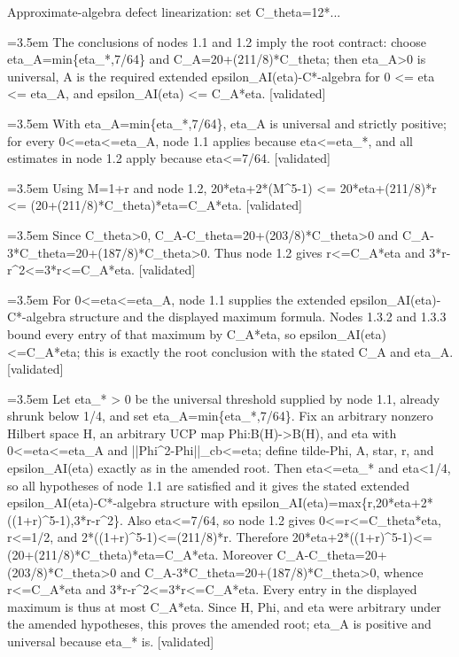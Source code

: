 \documentclass{article}
\newcommand{\step}[1]{\par\noindent\hangindent=3.5em\hangafter=1%
  \makebox[3.5em][l]{\textbf{#1.}}}
\newcommand{\steptag}[1]{\hfill{\small\textsf{[#1]}}}
\begin{document}
\begin{proofbox}{Approximate-algebra defect linearization: set C\_theta=12*...}
\step{1.3} The conclusions of nodes 1.1 and 1.2 imply the root contract: choose eta\_A=min\{eta\_*,7/64\} and C\_A=20+(211/8)*C\_theta; then eta\_A>0 is universal, A is the required extended epsilon\_AI(eta)-C*-algebra for 0 <= eta <= eta\_A, and epsilon\_AI(eta) <= C\_A*eta. \steptag{validated} \\[6pt]
\step{1.3.1} With eta\_A=min\{eta\_*,7/64\}, eta\_A is universal and strictly positive; for every 0<=eta<=eta\_A, node 1.1 applies because eta<=eta\_*, and all estimates in node 1.2 apply because eta<=7/64. \steptag{validated} \\[4pt]
\step{1.3.2} Using M=1+r and node 1.2, 20*eta+2*(M\textasciicircum{}5-1) <= 20*eta+(211/8)*r <= (20+(211/8)*C\_theta)*eta=C\_A*eta. \steptag{validated} \\[4pt]
\step{1.3.3} Since C\_theta>0, C\_A-C\_theta=20+(203/8)*C\_theta>0 and C\_A-3*C\_theta=20+(187/8)*C\_theta>0. Thus node 1.2 gives r<=C\_A*eta and 3*r-r\textasciicircum{}2<=3*r<=C\_A*eta. \steptag{validated} \\[4pt]
\step{1.3.4} For 0<=eta<=eta\_A, node 1.1 supplies the extended epsilon\_AI(eta)-C*-algebra structure and the displayed maximum formula. Nodes 1.3.2 and 1.3.3 bound every entry of that maximum by C\_A*eta, so epsilon\_AI(eta)<=C\_A*eta; this is exactly the root conclusion with the stated C\_A and eta\_A. \steptag{validated} \\[4pt]
\step{1.4} Let eta\_* > 0 be the universal threshold supplied by node 1.1, already shrunk below 1/4, and set eta\_A=min\{eta\_*,7/64\}. Fix an arbitrary nonzero Hilbert space H, an arbitrary UCP map Phi:B(H)->B(H), and eta with 0<=eta<=eta\_A and ||Phi\textasciicircum{}2-Phi||\_cb<=eta; define tilde-Phi, A, star, r, and epsilon\_AI(eta) exactly as in the amended root. Then eta<=eta\_* and eta<1/4, so all hypotheses of node 1.1 are satisfied and it gives the stated extended epsilon\_AI(eta)-C*-algebra structure with epsilon\_AI(eta)=max\{r,20*eta+2*((1+r)\textasciicircum{}5-1),3*r-r\textasciicircum{}2\}. Also eta<=7/64, so node 1.2 gives 0<=r<=C\_theta*eta, r<=1/2, and 2*((1+r)\textasciicircum{}5-1)<=(211/8)*r. Therefore 20*eta+2*((1+r)\textasciicircum{}5-1)<=(20+(211/8)*C\_theta)*eta=C\_A*eta. Moreover C\_A-C\_theta=20+(203/8)*C\_theta>0 and C\_A-3*C\_theta=20+(187/8)*C\_theta>0, whence r<=C\_A*eta and 3*r-r\textasciicircum{}2<=3*r<=C\_A*eta. Every entry in the displayed maximum is thus at most C\_A*eta. Since H, Phi, and eta were arbitrary under the amended hypotheses, this proves the amended root; eta\_A is positive and universal because eta\_* is. \steptag{validated} \\[4pt]
\end{proofbox}
\end{document}

